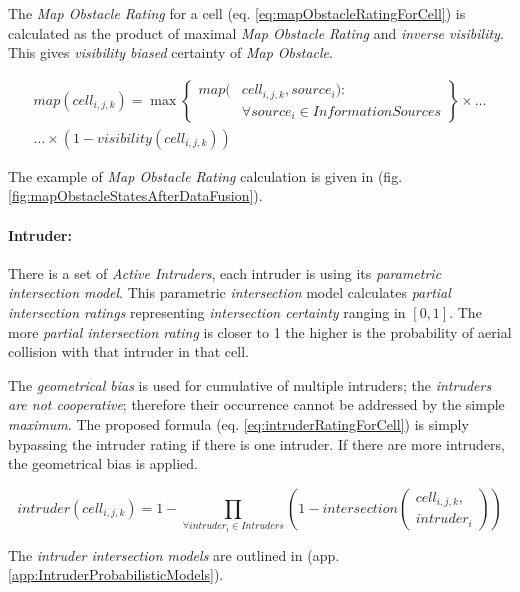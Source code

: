 The \emph{Map Obstacle Rating} for a cell (eq. \ref{eq:mapObstacleRatingForCell}) is calculated as the product of maximal \emph{Map Obstacle Rating} and \emph{inverse visibility}. This gives \emph{visibility biased} certainty of \emph{Map Obstacle}.

\begin{multline}\label{eq:mapObstacleRatingForCell}
    map(cell_{i,j,k}) = \max 
    \left\{\begin{aligned}map(&cell_{i,j,k},source_i):\\&\forall source_i \in InformationSources\end{aligned}\right\}\times\dots\\\dots\times \left(1-visibility(cell_{i,j,k})\right)
\end{multline}

\noindent The example of \emph{Map Obstacle Rating} calculation is given in (fig. \ref{fig:mapObstacleStatesAfterDataFusion}).


\paragraph{Intruder:} There is a set of \emph{Active Intruders}, each intruder is using its \emph{parametric intersection model}. This parametric \emph{intersection} model calculates \emph{partial intersection ratings} representing \emph{intersection certainty} ranging in $[0,1]$. The more \emph{partial intersection rating} is closer to 1 the higher is the probability of aerial collision with that intruder in that cell. 

The \emph{geometrical bias} is used for cumulative of multiple intruders; the \emph{intruders are not cooperative}; therefore their occurrence cannot be addressed by the simple \emph{maximum}. The proposed formula (eq. \ref{eq:intruderRatingForCell}) is simply bypassing the intruder rating if there is one intruder. If there  are more intruders, the geometrical bias is applied.


\begin{equation}\label{eq:intruderRatingForCell}
    intruder(cell_{i,j,k}) = 1 - \prod_{\forall intruder_i \in Intruders} \left(1- intersection\left(\begin{gathered}cell_{i,j,k},\\intruder_i\end{gathered}\right)\right)
\end{equation}

\noindent The \emph{intruder intersection models} are outlined in (app. \ref{app:IntruderProbabilisticModels}). 

